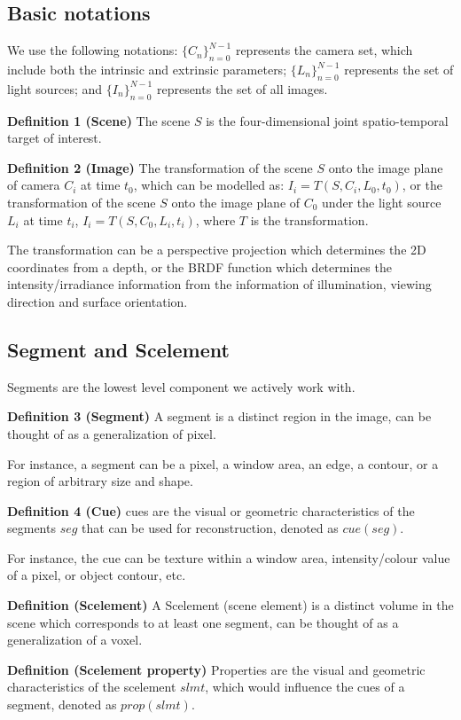 \subsection{Basic notations}
We use the following notations: $\{C_n\}_{n=0}^{N-1}$ represents the camera set, which include both the intrinsic and extrinsic parameters; $\{L_n\}_{n=0}^{N-1}$ represents the set of light sources; and $\{I_n\}_{n=0}^{N-1}$ represents the set of all images.

\textbf{Definition 1 (Scene)} The scene $S$ is the four-dimensional joint spatio-temporal target of interest.

\textbf{Definition 2 (Image)} The transformation of the scene $S$ onto the image plane of camera $C_i$ at time $t_0$, which can be modelled as: $I_i = T(S, C_i, L_0, t_0)$, or the transformation of the scene $S$ onto the image plane of $C_0$  under the light source $L_i$ at time $t_i$, $I_i= T(S, C_0, L_i, t_i)$, where $T$ is the transformation.

The transformation can be a perspective projection which determines the 2D coordinates from a depth, or the BRDF function which determines the intensity/irradiance information from the information of illumination, viewing direction and surface orientation.

\subsection{Segment and Scelement}
Segments are the lowest level component we actively work with.

\textbf{Definition 3 (Segment)} A segment is a distinct region in the image, can be thought of as a generalization of pixel.

For instance, a segment can be a pixel, a window area, an edge, a contour, or a region of arbitrary size and shape.

\textbf{Definition 4 (Cue)} cues are the visual or geometric characteristics of the segments $seg$ that can be used for reconstruction, denoted as $cue(seg)$.

For instance, the cue can be texture within a window area, intensity/colour value of a pixel, or object contour, etc.

\textbf{Definition (Scelement)} A Scelement (scene element) is a distinct volume in the scene which corresponds to at least one segment, can be thought of as a generalization of a voxel.

\textbf{Definition (Scelement property)} Properties are the visual and geometric characteristics of the scelement $slmt$, which would influence the cues of a segment, denoted as $prop(slmt)$.

